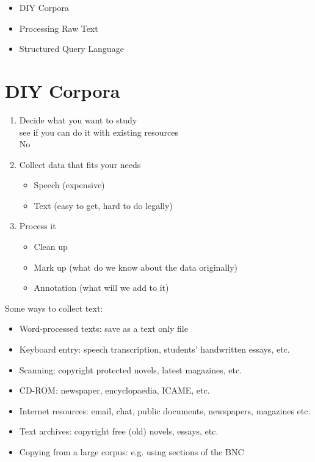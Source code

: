 \documentclass[a4paper,landscape,headrule,footrule,xetex]{foils}
\begin{document}

\maketitle



\begin{itemize} 
\item DIY Corpora
\item Processing Raw Text
\item Structured Query Language
\end{itemize}



\section{DIY Corpora}


\begin{enumerate}
\item Decide what you want to study
\\ see if you can do it with existing resources
\\ No \frownie
\item Collect data that fits your needs
  \begin{itemize}
  \item Speech (expensive)
  \item Text (easy to get, hard to do legally)
  \end{itemize}
\item Process it
  \begin{itemize}
  \item Clean up
  \item Mark up (what do we know about the data originally)
  \item Annotation (what will we add to it)
  \end{itemize}
\end{enumerate}


Some ways to collect text:

\begin{itemize}\addtolength{\itemsep}{-1ex}
\item Word-processed texts: save as a text only file
\item Keyboard entry: speech transcription, students' handwritten essays, etc.
\item Scanning: copyright protected novels, latest magazines, etc.
\item CD-ROM: newspaper, encyclopaedia, ICAME, etc.
\item Internet resources: email, chat, public documents, newspapers, magazines etc.
\item  Text archives: copyright free (old) novels, essays, etc.
\item Copying from a large corpus: e.g. using sections of the BNC
\end{itemize}
\end{document}
